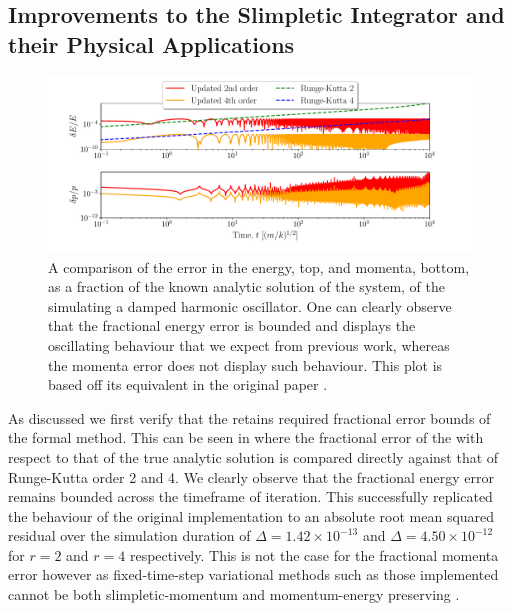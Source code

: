 \subsection{Improvements to the Slimpletic Integrator and their Physical Applications}
\label{sec:results-si}

\begin{figure}[t]
  \includegraphics[width=\columnwidth]{figures/dho_energy_momenta_fractional_err.pdf}
  \caption{A comparison of the error in the energy, top, and momenta, bottom, as a fraction of the known analytic solution of the system, of the \updimpl{} simulating a damped harmonic oscillator. One can clearly observe that the fractional energy error is bounded and displays the oscillating behaviour that we expect from previous work, whereas the momenta error does not display such behaviour. This plot is based off its equivalent in the original paper \cite[Figure 2, bottom]{tsangSLIMPLECTICINTEGRATORSVARIATIONAL2015}.}
\label{fig:dho_energy_bounds}
\end{figure}

As discussed we first verify that the \updimpl{} retains required fractional error bounds of the formal method. This can be seen in  where the fractional error of the \updimpl{} with respect to that of the true analytic solution is compared directly against that of Runge-Kutta order 2 and 4. We clearly observe that the fractional energy error remains bounded across the timeframe of iteration.
This successfully replicated the behaviour of the original implementation to an absolute root mean squared residual over the simulation duration of $\Delta = 1.42 \times 10^{-13}$ and $\Delta = 4.50 \times 10^{-12}$ for $r = 2$ and $r = 4$ respectively.
This is not the case for the fractional momenta error however as fixed-time-step variational methods such as those implemented cannot be both slimpletic-momentum and momentum-energy preserving \cite{zhongLiePoissonHamiltonJacobiTheory1988}.

